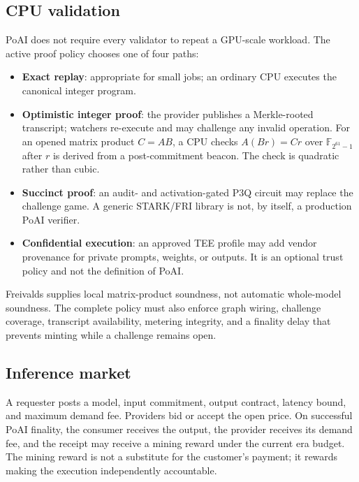 \subsection{CPU validation}

PoAI does not require every validator to repeat a GPU-scale workload. The active
proof policy chooses one of four paths:

\begin{itemize}[leftmargin=1.2em]
  \item \textbf{Exact replay}: appropriate for small jobs; an ordinary CPU
        executes the canonical integer program.
  \item \textbf{Optimistic integer proof}: the provider publishes a Merkle-rooted
        transcript; watchers re-execute and may challenge any invalid operation.
        For an opened matrix product $C=AB$, a CPU checks
        $A(Br)=Cr$ over $\mathbb{F}_{2^{61}-1}$ after $r$ is derived from a
        post-commitment beacon. The check is quadratic rather than cubic.
  \item \textbf{Succinct proof}: an audit- and activation-gated P3Q circuit may
        replace the challenge game. A generic STARK/FRI library is not, by
        itself, a production PoAI verifier.
  \item \textbf{Confidential execution}: an approved TEE profile may add vendor
        provenance for private prompts, weights, or outputs. It is an optional
        trust policy and not the definition of PoAI.
\end{itemize}

Freivalds supplies local matrix-product soundness, not automatic whole-model
soundness. The complete policy must also enforce graph wiring, challenge
coverage, transcript availability, metering integrity, and a finality delay that
prevents minting while a challenge remains open.

\subsection{Inference market}

A requester posts a model, input commitment, output contract, latency bound, and
maximum demand fee. Providers bid or accept the open price. On successful PoAI
finality, the consumer receives the output, the provider receives its demand
fee, and the receipt may receive a mining reward under the current era budget.
The mining reward is not a substitute for the customer's payment; it rewards
making the execution independently accountable.

